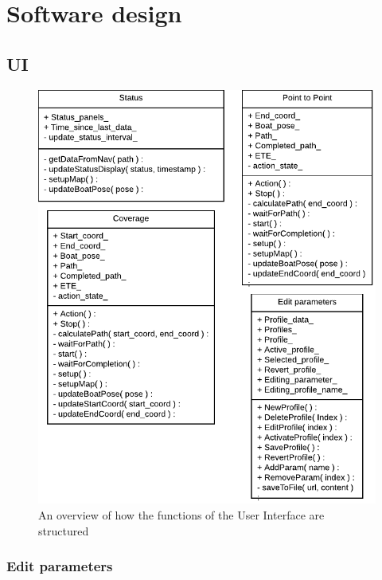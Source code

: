 \section{Software design}

\subsection{UI}

\begin{figure}[H]
	\centering
	\includegraphics[width=1\linewidth]{Images/Design/User_Interface_overview}
	\caption{An overview of how the functions of the User Interface are structured}
	\label{fig:userinterfaceoverview}
\end{figure}


\subsubsection{Edit parameters}

